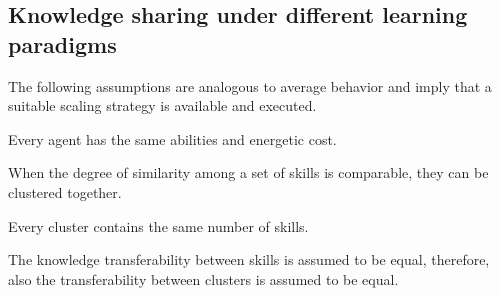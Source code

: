 \subsection{Knowledge sharing under different learning paradigms}
The following assumptions are analogous to average behavior and imply that a suitable scaling strategy is available and executed.
\begin{tcolorbox}
	\begin{assumption}\label{assumption:agent_similarity}
		Every agent has the same abilities and energetic cost.
	\end{assumption}
\end{tcolorbox}
\begin{tcolorbox}
	\begin{assumption}\label{assumption:skill_clustering} When the degree of similarity among a set of skills is comparable, they can be clustered together.
		\end{assumption}
\end{tcolorbox}
\begin{tcolorbox}
	\begin{assumption}\label{assumption:cluster_size}
		Every cluster contains the same number of skills.
	\end{assumption}
\end{tcolorbox}
\begin{tcolorbox}
	\begin{assumption}\label{assumption:cluster_transferability}
		The knowledge transferability between skills is assumed to be equal, therefore, also the transferability between clusters is assumed to be equal.
	\end{assumption}
\end{tcolorbox}
